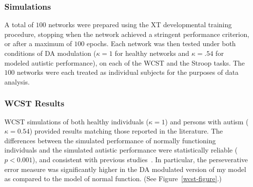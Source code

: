 \subsubsection{Simulations} 
A total of $100$ networks were prepared using the XT developmental
training procedure, stopping when the network achieved a stringent
performance criterion, or after a maximum of $100$ epochs.  Each
network was then tested under both conditions of DA modulation ($\kappa = 1$ for healthy networks and $\kappa = .54$ for modeled autistic performance), on
each of the WCST and the Stroop tasks.  The $100$ networks were each
treated as individual subjects for the purposes of data analysis.

\subsubsection{WCST Results} 
WCST simulations of both healthy individuals ($\kappa = 1$) and persons with autism ($\kappa = 0.54$) 
provided results matching those reported in the literature.  The differences between the 
simulated performance of normally functioning individuals and the
simulated autistic performance were statistically reliable
($p < 0.001$), and consistent with previous
studies~\cite{PriorMR:1990:AutismWCST,Ozonoff:1999:AutismStroopWCST,MinshewNJ:2002:AutismWCST}.
In particular, the perseverative error measure was significantly
higher in the DA modulated version of my model as compared to the
model of normal function.  (See Figure~\ref{wcst-figure}.)


